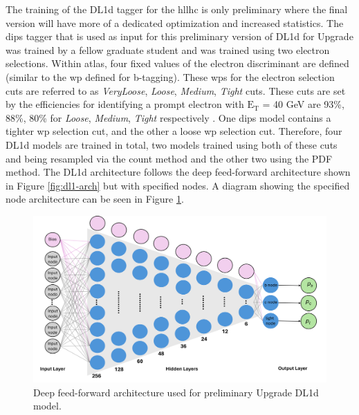 The training of the DL1d tagger for the \gls{hllhc} is only preliminary where the final version will have more of a dedicated optimization and increased statistics. The \gls{dips} tagger that is 
used as input for this preliminary version of DL1d for Upgrade was trained by a fellow graduate student and was trained using two electron selections. Within \gls{atlas}, four fixed values
of the electron discriminant are defined (similar to the \gls{wp} defined for b-tagging).
These \gls{wp}s for the electron selection cuts are referred to as \textit{VeryLoose}, \textit{Loose}, \textit{Medium}, \textit{Tight} cuts. These cuts are set by the efficiencies for 
identifying a prompt electron with $\textrm{E}_{\textrm{T}}$ = 40 GeV are 93\%, 88\%, 80\% for \textit{Loose}, \textit{Medium}, \textit{Tight} respectively \cite{ele-cut}. One \gls{dips} model contains a tighter 
\gls{wp} selection cut, and the other a loose \gls{wp} selection cut.  Therefore, four DL1d models are trained in total, two models trained using both of these cuts and 
being resampled via the count method and the other two using the PDF method. The DL1d architecture follows the deep feed-forward architecture shown in Figure \ref{fig:dl1-arch} but with specified nodes.
A diagram showing the specified node architecture can be seen in Figure \ref{fig:dl1d-arch}.

\begin{figure}[h]
    \centering
    \includegraphics[scale=0.5]{figs/ch5/dl1d-arch.png}
    \caption{ Deep feed-forward architecture used for preliminary Upgrade DL1d model.}
\label{fig:dl1d-arch}
\end{figure}

